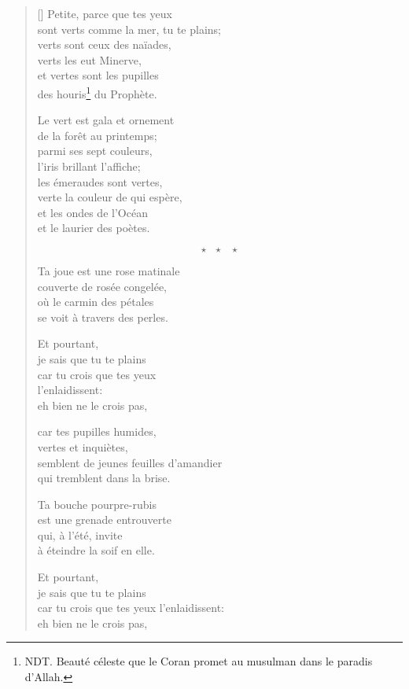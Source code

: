 \documentclass[a4paper,12pt]{book}
\begin{document}
\begin{verse}[\versewidth]
  Petite, parce que tes yeux \\
  sont verts comme la mer, tu te plains; \\
  verts sont ceux des naïades, \\
  verts les eut Minerve, \\
  et vertes sont les pupilles \\
  des houris\footnote{NDT. Beauté céleste que le Coran promet au musulman dans le paradis d'Allah.} du Prophète.

  Le vert est gala et ornement \\
  de la forêt au printemps; \\
  parmi ses sept couleurs, \\
  l'iris brillant l'affiche; \\
  les émeraudes sont vertes, \\
  verte la couleur de qui espère, \\
  et les ondes de l'Océan \\
  et le laurier des poètes.

  $$\star \ \ \ \star \ \ \ \star$$

  Ta joue est une rose matinale \\
  couverte de rosée congelée, \\
  où le carmin des pétales \\
  se voit à travers des perles.

  Et pourtant, \\
  je sais que tu te plains \\
  car tu crois que tes yeux \\
  l'enlaidissent: \\
  eh bien ne le crois pas,

  car tes pupilles humides, \\
  vertes et inquiètes, \\
  semblent de jeunes feuilles d'amandier \\
  qui tremblent dans la brise.

  Ta bouche pourpre-rubis \\
  est une grenade entrouverte \\
  qui, à l'été, invite \\
  à éteindre la soif en elle.

  Et pourtant, \\
  je sais que tu te plains \\
  car tu crois que tes yeux
  l'enlaidissent: \\
  eh bien ne le crois pas,


\end{verse}
\end{document}
